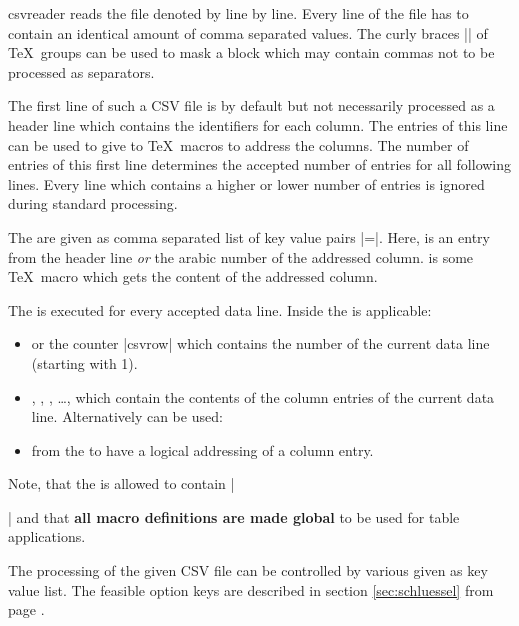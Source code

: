 \documentclass[a4paper,11pt]{ltxdoc}
\begin{document}
\begin{docCommand}{csvreader}{}
   reads the file denoted by  line by line.
  Every line of the file has to contain an identical amount of
  comma separated values. The curly braces |{}| of \TeX\ groups can be used
  to mask a block which may contain commas not to be processed as separators.\smallskip

  The first line of such a CSV file is by default but not necessarily
  processed as a header line which contains the identifiers for each column.
  The entries of this line can be used to give  to \TeX\ macros
  to address the columns. The number of entries of this first line
  determines the accepted number of entries for all following lines.
  Every line which contains a higher or lower number of entries is ignored
  during standard processing.\smallskip

  The  are given as comma separated list of key value pairs
  \mbox{|=|}. Here,  is an entry from the
  header line \emph{or} the arabic number of the addressed column.
   is some \TeX\ macro which gets the content of the addressed column.\smallskip

  The  is executed for every accepted data line. Inside the
   is applicable:
  \begin{itemize}
  \item {} or the counter |csvrow| which contains the number of the
    current data line (starting with 1).
  \item {}, , , \ldots,
    which contain the contents of the column entries of the current data line.
    Alternatively can be used:
  \item {} from the  to have a logical
    addressing of a column entry.
  \end{itemize}
  Note, that the  is allowed to contain |\par| and
  that \textbf{all macro definitions are made global} to be used for table applications.\smallskip

  The processing of the given CSV file can be controlled by various
   given as key value list. The feasible option keys
  are described in section \ref{sec:schluessel} from page \pageref{sec:schluessel}.


\end{docCommand}
\end{document}
